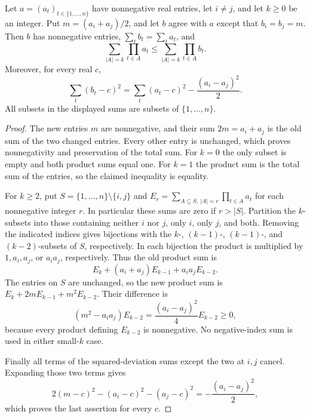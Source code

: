 \begin{lemma}
Let $a=(a_t)_{t\in\{1,\ldots,n\}}$ have nonnegative real entries, let
$i\ne j$, and let $k\ge0$ be an integer. Put $m=(a_i+a_j)/2$, and let
$b$ agree with $a$ except that $b_i=b_j=m$. Then $b$ has nonnegative
entries, $\sum_t b_t=\sum_t a_t$, and
\[
 \sum_{|A|=k}\prod_{t\in A}a_t
 \le \sum_{|A|=k}\prod_{t\in A}b_t.
\]
Moreover, for every real $c$,
\[
 \sum_t(b_t-c)^2=\sum_t(a_t-c)^2-\frac{(a_i-a_j)^2}{2}.
\]
All subsets in the displayed sums are subsets of $\{1,\ldots,n\}$.
\end{lemma}
\begin{proof}
The new entries $m$ are nonnegative, and their sum $2m=a_i+a_j$
is the old sum of the two changed entries. Every other entry is unchanged,
which proves nonnegativity and preservation of the total sum.
For $k=0$ the only subset is empty and both product sums equal one.
For $k=1$ the product sum is the total sum of the entries, so the
claimed inequality is equality.

For $k\ge2$, put $S=\{1,\ldots,n\}\setminus\{i,j\}$ and
$E_r=\sum_{A\subseteq S,\ |A|=r}\prod_{t\in A}a_t$ for each
nonnegative integer $r$. In particular these sums are zero if $r>|S|$.
Partition the $k$-subsets into those containing neither $i$ nor $j$,
only $i$, only $j$, and both. Removing the indicated indices gives
bijections with the $k$-, $(k-1)$-, $(k-1)$-, and $(k-2)$-subsets
of $S$, respectively. In each bijection the product is multiplied
by $1,a_i,a_j$, or $a_i a_j$, respectively. Thus the old product sum is
\[
 E_k+(a_i+a_j)E_{k-1}+a_i a_j E_{k-2}.
\]
The entries on $S$ are unchanged, so the new product sum is
$E_k+2mE_{k-1}+m^2E_{k-2}$. Their difference is
\[
 (m^2-a_i a_j)E_{k-2}
 =\frac{(a_i-a_j)^2}{4}E_{k-2}\ge0,
\]
because every product defining $E_{k-2}$ is nonnegative.
No negative-index sum is used in either small-$k$ case.

Finally all terms of the squared-deviation sums except the two at
$i,j$ cancel. Expanding those two terms gives
\[
 2(m-c)^2-(a_i-c)^2-(a_j-c)^2
 =-\frac{(a_i-a_j)^2}{2},
\]
which proves the last assertion for every $c$.
\end{proof}
